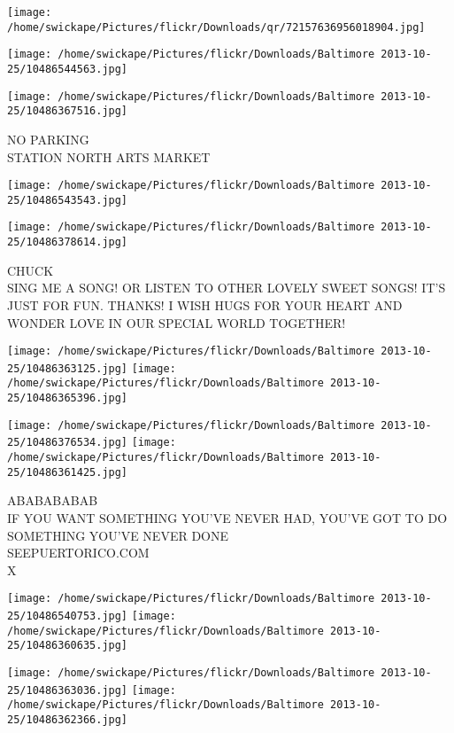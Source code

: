 \documentclass[10pt,letterpaper]{article}
\begin{document}
\texttt{[image: /home/swickape/Pictures/flickr/Downloads/qr/72157636956018904.jpg]}
\pagebreak

\texttt{[image: /home/swickape/Pictures/flickr/Downloads/Baltimore 2013-10-25/10486544563.jpg]}

\vspace{0.25in}
\texttt{[image: /home/swickape/Pictures/flickr/Downloads/Baltimore 2013-10-25/10486367516.jpg]}

NO PARKING\\
STATION NORTH ARTS MARKET
\pagebreak

\texttt{[image: /home/swickape/Pictures/flickr/Downloads/Baltimore 2013-10-25/10486543543.jpg]}

\vspace{0.25in}
\texttt{[image: /home/swickape/Pictures/flickr/Downloads/Baltimore 2013-10-25/10486378614.jpg]}

CHUCK\\
SING ME A SONG!  OR LISTEN TO OTHER LOVELY SWEET SONGS! IT'S JUST FOR FUN. THANKS! I WISH HUGS FOR YOUR HEART AND WONDER LOVE IN OUR SPECIAL WORLD TOGETHER!
\pagebreak

\texttt{[image: /home/swickape/Pictures/flickr/Downloads/Baltimore 2013-10-25/10486363125.jpg]}
\texttt{[image: /home/swickape/Pictures/flickr/Downloads/Baltimore 2013-10-25/10486365396.jpg]}

\texttt{[image: /home/swickape/Pictures/flickr/Downloads/Baltimore 2013-10-25/10486376534.jpg]}
\texttt{[image: /home/swickape/Pictures/flickr/Downloads/Baltimore 2013-10-25/10486361425.jpg]}

ABABABABAB\\
IF YOU WANT SOMETHING YOU'VE NEVER HAD, YOU'VE GOT TO DO SOMETHING YOU'VE NEVER DONE\\
SEEPUERTORICO.COM\\
X
\pagebreak

\texttt{[image: /home/swickape/Pictures/flickr/Downloads/Baltimore 2013-10-25/10486540753.jpg]}
\texttt{[image: /home/swickape/Pictures/flickr/Downloads/Baltimore 2013-10-25/10486360635.jpg]}

\texttt{[image: /home/swickape/Pictures/flickr/Downloads/Baltimore 2013-10-25/10486363036.jpg]}
\texttt{[image: /home/swickape/Pictures/flickr/Downloads/Baltimore 2013-10-25/10486362366.jpg]}
\end{document}

